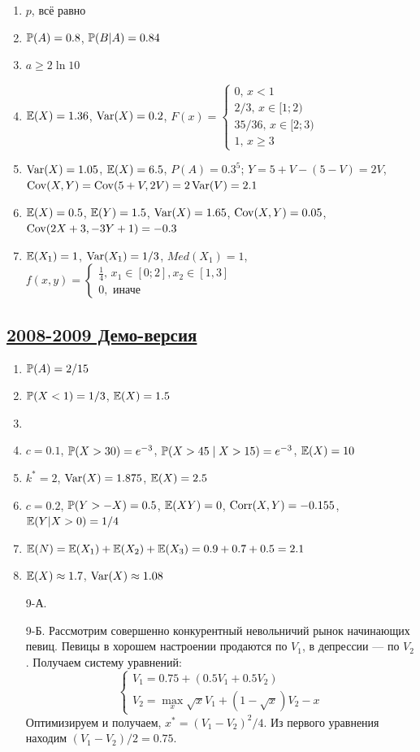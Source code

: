 \begin{enumerate}
\item $p$, всё равно
\item $\P(A) = 0.8$, $\P(B|A) = 0.84$
\item $a \geq 2\ln 10$
\item $\E(X) = 1.36$, $\Var(X) = 0.2$, $F(x) = \begin{cases}
0, \, x<1 \\
2/3, \, x\in [1;2) \\
35/36, \, x\in[2;3) \\
1, \, x\geq 3
\end{cases}$
\item $\Var(X) = 1.05$, $\E(X) = 6.5$, $P(A) = 0.3^5$; $Y = 5 + V - (5 - V) = 2V$,
$\Cov(X, Y) = \Cov(5 + V, 2V) = 2\Var(V) = 2.1$
\item $\E(X) = 0.5$, $\E(Y) = 1.5$, $\Var(X) = 1.65$, $\Cov(X, Y) = 0.05$,
$\Cov(2X + 3, -3Y + 1) = -0.3$
\item $\E(X_1) = 1$, $\Var(X_1) = 1/3$, $Med(X_1) = 1$, $f(x,y) = \begin{cases}
\frac{1}{4}, \, x_1\in [0;2], x_2\in [1,3] \\
0, \text{ иначе}
\end{cases}$
\end{enumerate}



\subsection[2008-2009 Демо-версия]{\hyperref[sec:kr_01_2008_2009_demo]{2008-2009 Демо-версия}}
\label{sec:sol_kr_01_2008_2009_demo}

\begin{enumerate}
\item $\P(A) = 2/15$
\item $\P(X < 1) = 1/3$, $\E(X) = 1.5$
\item
\item $c = 0.1$, $\P(X > 30) = e^{-3}$, $\P(X > 45 \mid X > 15) = e^{-3}$, $\E(X) = 10$
\item $k^*=2$, $\Var(X) = 1.875$, $\E(X) = 2.5$
\item $c = 0.2$, $\P(Y > -X) = 0.5$, $\E(XY) = 0$, $\Corr(X, Y) = -0.155$, $\E(Y| X > 0) = 1/4$
\item $\E(N)=\E(X_1)+\E(X_2)+\E(X_3)=0.9+0.7+0.5=2.1$
\item $\E(X) \approx 1.7$, $\Var(X) \approx 1.08$
\item[9-А.]
\item[9-Б.] Рассмотрим совершенно конкурентный невольничий рынок начинающих певиц.
Певицы в хорошем настроении продаются по $V_1$, в депрессии — по $V_2$. Получаем
систему уравнений:
\[
\begin{cases}
  V_1 = 0.75 + (0.5 V_1 + 0.5 V_2) \\
  V_2 = \max_x \sqrt{x}V_1 + (1 - \sqrt{x})V_2 - x
\end{cases}
\]
Оптимизируем и получаем, $x^* = (V_1 - V_2)^2/4$. Из первого уравнения находим
$(V_1 - V_2) / 2 = 0.75$.
\end{enumerate}


